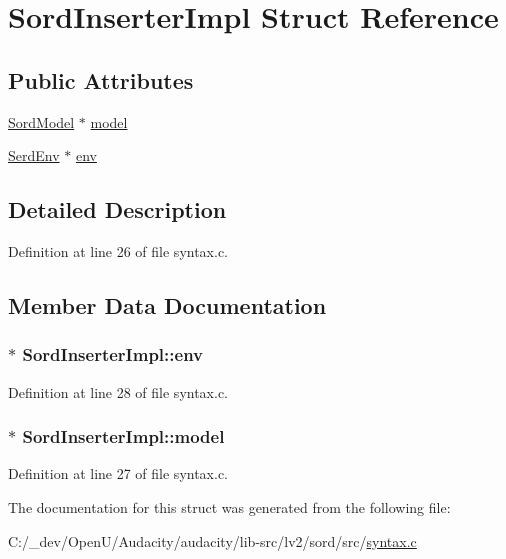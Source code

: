 \hypertarget{struct_sord_inserter_impl}{}\section{Sord\+Inserter\+Impl Struct Reference}
\label{struct_sord_inserter_impl}
\subsection*{Public Attributes}
\begin{DoxyCompactItemize}
\item 
\hyperlink{group__sord_gaea018cfebfedd10280b1d8dd6d650a28}{Sord\+Model} $\ast$ \hyperlink{struct_sord_inserter_impl_a1197cef195f916f6bd58e54bc3c484ca}{model}
\item 
\hyperlink{group__serd_gaea4226dd80abea7afa05986f195d4755}{Serd\+Env} $\ast$ \hyperlink{struct_sord_inserter_impl_ae3c8d7741d63412edf1ea010bec734f6}{env}
\end{DoxyCompactItemize}


\subsection{Detailed Description}


Definition at line 26 of file syntax.\+c.



\subsection{Member Data Documentation}
\subsubsection[{\texorpdfstring{env}{env}}]{$\ast$ Sord\+Inserter\+Impl\+::env}\hypertarget{struct_sord_inserter_impl_ae3c8d7741d63412edf1ea010bec734f6}{}\label{struct_sord_inserter_impl_ae3c8d7741d63412edf1ea010bec734f6}


Definition at line 28 of file syntax.\+c.

\subsubsection[{\texorpdfstring{model}{model}}]{$\ast$ Sord\+Inserter\+Impl\+::model}\hypertarget{struct_sord_inserter_impl_a1197cef195f916f6bd58e54bc3c484ca}{}\label{struct_sord_inserter_impl_a1197cef195f916f6bd58e54bc3c484ca}


Definition at line 27 of file syntax.\+c.



The documentation for this struct was generated from the following file\+:\begin{DoxyCompactItemize}
\item 
C\+:/\+\_\+dev/\+Open\+U/\+Audacity/audacity/lib-\/src/lv2/sord/src/\hyperlink{syntax_8c}{syntax.\+c}\end{DoxyCompactItemize}
